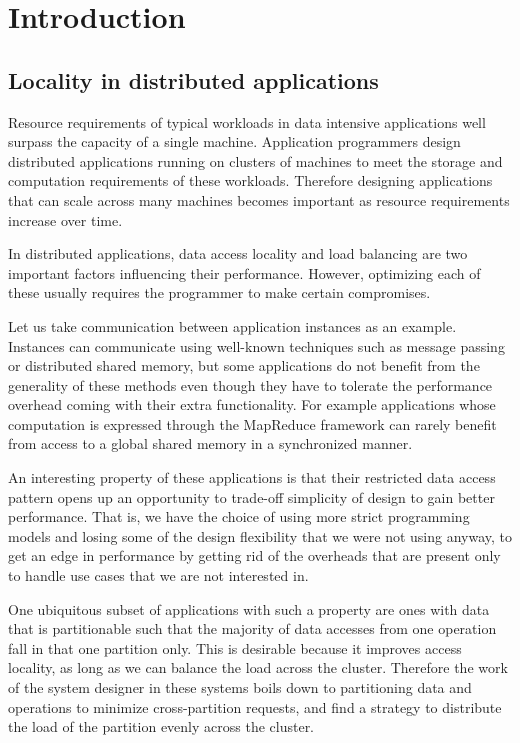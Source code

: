 \chapter{Introduction}
\label{chap:introduction}

\section{Locality in distributed applications}
Resource requirements of typical workloads in data intensive applications well surpass the
capacity of a single machine. 
Application programmers design distributed applications running on clusters of
machines to
meet the storage and computation requirements of these workloads. Therefore
designing applications that can scale across many machines becomes important as
resource requirements increase over time.

In distributed applications, data access locality and load balancing
are two important factors influencing their performance. However,
optimizing each of these usually requires the programmer to make certain
compromises.

Let us take communication between application instances as an example.
Instances can communicate using well-known techniques such as message passing
or distributed shared memory, but some applications do not benefit from the
generality of these methods even though they have to tolerate the performance
overhead coming with their extra functionality. For example applications whose
computation is expressed through the MapReduce \cite{dean2008mapreduce}
framework can rarely benefit from access to a
global shared memory in a synchronized manner.

An interesting property of these applications is that their
restricted data access pattern opens up an opportunity to trade-off simplicity
of design to gain better performance. That is, we have the choice of using more
strict programming models and losing some of the design flexibility that we
were not using anyway, to get an edge in performance by getting rid of the
overheads that are present only to handle use cases that we are not interested
in.

One ubiquitous subset of applications with such a property are
ones with data that is partitionable such that the majority of data
accesses from one operation fall in that one partition only.
This is desirable because it improves access locality, as
long as we can balance the load across the cluster. Therefore the work of
the system designer in these systems boils down to partitioning data and
operations to minimize cross-partition requests, and find a strategy to
distribute the load of the partition evenly across the cluster.

